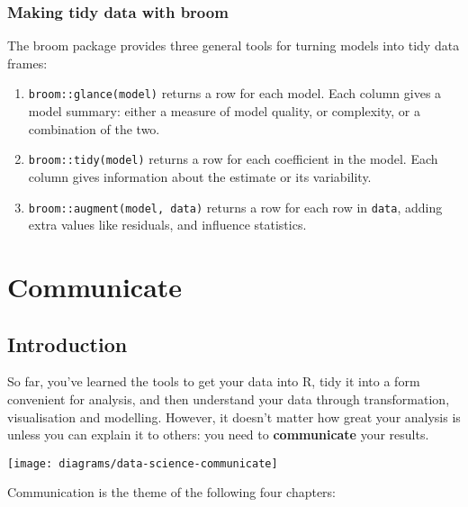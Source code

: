 \documentclass[]{book}
\begin{document}
\hypertarget{making-tidy-data-with-broom}{\section{Making tidy data with
broom}\label{making-tidy-data-with-broom}}

The broom package provides three general tools for turning models into
tidy data frames:

\begin{enumerate}
\def\labelenumi{\arabic{enumi}.}
\item
  \texttt{broom::glance(model)} returns a row for each model. Each
  column gives a model summary: either a measure of model quality, or
  complexity, or a combination of the two.
\item
  \texttt{broom::tidy(model)} returns a row for each coefficient in the
  model. Each column gives information about the estimate or its
  variability.
\item
  \texttt{broom::augment(model,\ data)} returns a row for each row in
  \texttt{data}, adding extra values like residuals, and influence
  statistics.
\end{enumerate}

\part{Communicate}\label{part-communicate}


\chapter{Introduction}\label{communicate-intro}

So far, you've learned the tools to get your data into R, tidy it into a
form convenient for analysis, and then understand your data through
transformation, visualisation and modelling. However, it doesn't matter
how great your analysis is unless you can explain it to others: you need
to \textbf{communicate} your results.

\begin{center}\texttt{[image: diagrams/data-science-communicate]} \end{center}

Communication is the theme of the following four chapters:
\end{document}
